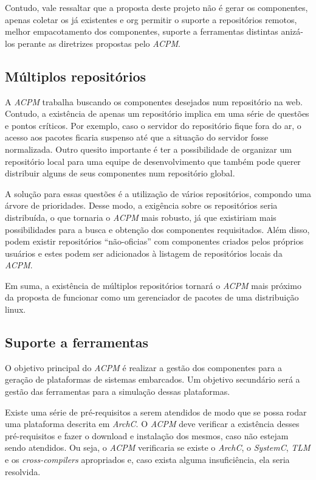 \documentclass[10pt,a4paper]{article}
\begin{document}
Contudo, vale ressaltar que a proposta deste projeto não é gerar os
componentes, apenas coletar os já existentes e org permitir o suporte a repositórios
remotos, melhor empacotamento dos componentes, suporte a ferramentas distintas
anizá-los perante as
diretrizes propostas pelo \textit{ACPM}.

\subsection{Múltiplos repositórios}
A \textit{ACPM} trabalha buscando os componentes desejados num
repositório na web. Contudo, a existência de apenas um repositório
implica em uma série de questões e pontos críticos. Por exemplo, caso
o servidor do repositório fique fora do ar, o acesso aos pacotes
ficaria suspenso até que a situação do servidor fosse
normalizada. Outro quesito importante é ter a possibilidade de
organizar um repositório local para uma equipe de desenvolvimento que
também pode querer distribuir alguns de seus componentes num
repositório global.

A solução para essas questões é a utilização de vários
repositórios, compondo uma árvore de prioridades. Desse modo, a
exigência sobre os repositórios seria distribuída, o que tornaria o
\textit{ACPM} mais robusto, já que existiriam mais possibilidades para
a busca e obtenção dos componentes requisitados. Além disso, podem
existir repositórios ``não-oficias'' com componentes criados pelos
próprios usuários e estes podem ser adicionados à listagem de
repositórios locais da \textit{ACPM}.

Em suma, a existência de múltiplos repositórios tornará o
\textit{ACPM} mais próximo da proposta de funcionar como um
gerenciador de pacotes de uma distribuição linux.

\subsection{Suporte a ferramentas}
O objetivo principal do \textit{ACPM} é realizar a gestão dos
componentes para a geração de plataformas de sistemas embarcados. Um
objetivo secundário será a gestão das ferramentas para a simulação
dessas plataformas.

Existe uma série de pré-requisitos a serem atendidos de modo que se
possa rodar uma plataforma descrita em \textit{ArchC}. O \textit{ACPM}
deve verificar a existência desses pré-requisitos e fazer o download e
instalação dos mesmos, caso não estejam sendo atendidos. Ou seja, o
\textit{ACPM} verificaria se existe o \textit{ArchC}, o
\textit{SystemC}, \textit{TLM} e os \textit{cross-compilers}
apropriados e, caso exista alguma insuficiência, ela seria resolvida.
\end{document}
